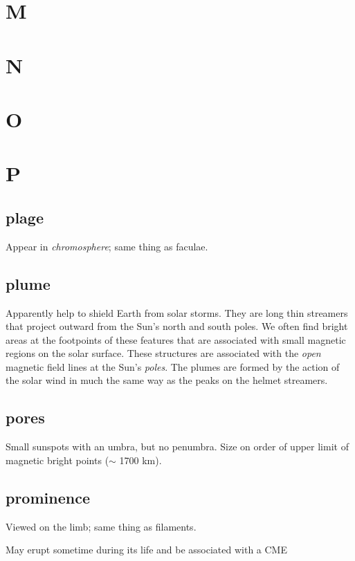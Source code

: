 \documentclass[12pt]{article}
\begin{document}
\section{M}
\section{N}
\section{O}

\section{P}
\subsection*{plage}
    \begin{itemize*}
        \item Appear in \emph{chromosphere}; same thing as faculae.
    \end{itemize*}

\subsection*{plume}
Apparently help to shield Earth from solar storms.
They are long thin streamers that project outward from the Sun's north and
south poles. We often find bright areas at the footpoints of these
features that are associated with small magnetic regions on the solar
surface. These structures are associated with the \emph{open} magnetic
field lines at the Sun's \emph{poles}. The plumes are formed by the action of
the solar wind in much the same way as the peaks on the helmet
streamers.

\subsection*{pores}
Small sunspots with an umbra, but no penumbra.
Size on order of upper limit of magnetic bright points ($\sim$ 1700
km).

\subsection*{prominence}
    \begin{itemize*}
        \item Viewed on the limb; same thing as filaments.
        \item May erupt sometime during its life and be associated
        with a CME
    \end{itemize*}
\end{document}
